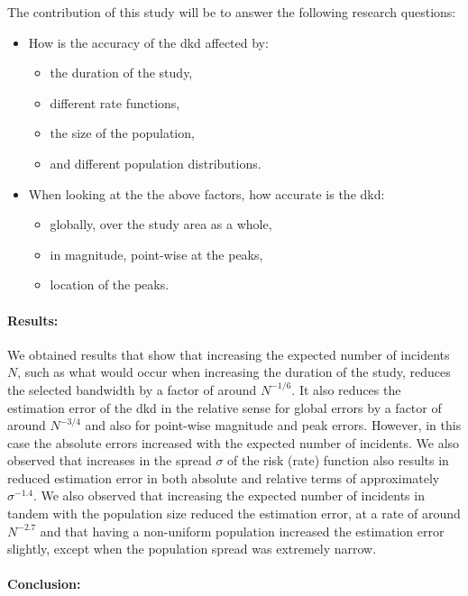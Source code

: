 \begin{onehalfspace}
The contribution of this study will be to answer the following research questions:
\begin{itemize}
    \item How is the accuracy of the \acrlong{dkd} affected by:
    \begin{itemize}
        \item the duration of the study,%
        \item different rate functions,%
        \item the size of the population,%
        \item and different population distributions.%
    \end{itemize}
    \item When looking at the the above factors,
    how accurate is the \acrlong{dkd}:
    \begin{itemize}
        \item globally, over the study area as a whole,%
        \item in magnitude, point-wise at the peaks,%
        \item location of the peaks.%
    \end{itemize}
\end{itemize}

\paragraph*{Results:}

We obtained results that show that increasing the expected number of incidents $N$,
such as what would occur when increasing the duration of the study,
reduces the selected bandwidth by a factor of around $N^{-1/6}$.
It also reduces the estimation error of the \acrlong{dkd} in the relative sense
for global errors by a factor of around $N^{-3/4}$ and also for point-wise magnitude and peak errors.
However, in this case the absolute errors increased with the expected number of incidents.
We also observed that increases in the spread $\sigma$ of the risk (rate) function also results in reduced estimation error
in both absolute and relative terms of approximately $\sigma^{-1.4}$.
We also observed that increasing the expected number of incidents in tandem with the population size reduced the estimation error,
at a rate of around $N^{-2.7}$
and that having a non-uniform population increased the estimation error slightly, 
except when the population spread was extremely narrow.

\paragraph*{Conclusion:}


\end{onehalfspace}
